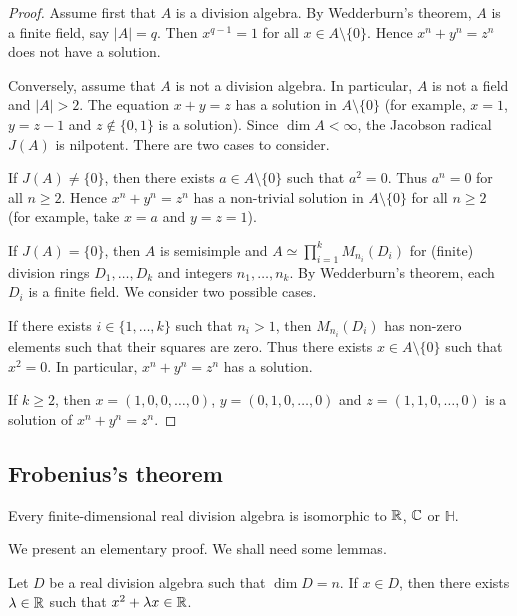 \begin{proof}
    Assume first that $A$ is a division algebra. By Wedderburn's theorem, 
    $A$ is a finite field, say $|A|=q$. Then $x^{q-1}=1$ for all $x\in A\setminus\{0\}$.
    Hence $x^n+y^n=z^n$ does not have a solution. 
    
    Conversely, assume that $A$ is not a division algebra. In particular, 
    $A$ is not a field and $|A|>2$. The equation $x+y=z$ has a solution in $A\setminus\{0\}$ (for example, $x=1$, $y=z-1$ and $z\not\in\{0,1\}$ is a solution). Since
    $\dim A<\infty$, the Jacobson radical $J(A)$ is nilpotent. There are two 
    cases to consider. 
    
    If $J(A)\ne\{0\}$, 
    then there exists $a\in A\setminus\{0\}$ such that $a^2=0$. Thus $a^n=0$ 
    for all $n\geq2$. Hence $x^n+y^n=z^n$ has a non-trivial
    solution in $A\setminus\{0\}$ for all $n\geq2$ (for example, take 
    $x=a$ and $y=z=1$).
    
    If $J(A)=\{0\}$, then $A$ is semisimple and 
    $A\simeq\prod_{i=1}^k M_{n_i}(D_i)$ for (finite) division rings $D_1,\dots,D_k$
    and integers $n_1,\dots,n_k$. By Wedderburn's theorem, each $D_i$ is a finite
    field. We consider two possible cases. 
    
    If there exists $i\in\{1,\dots,k\}$ such that $n_i>1$, then
    $M_{n_i}(D_i)$ has non-zero elements such that their squares are zero. Thus 
    there exists $x\in A\setminus\{0\}$ such that $x^2=0$. In particular, 
    $x^n+y^n=z^n$ has a solution. 
    
    If $k\geq 2$, then $x=(1,0,0,\dots,0)$, $y=(0,1,0,\dots,0)$ 
    and $z=(1,1,0,\dots,0)$ is a solution of $x^n+y^n=z^n$.
\end{proof}


\subsection{Frobenius's theorem}

\begin{theorem}[Frobenius]
	\label{thm:Frobenius}
	Every finite-dimensional real division algebra is isomorphic to $\mathbb{R}$, $\mathbb{C}$
	or $\mathbb{H}$.
\end{theorem}

We present an elementary proof. We shall need some lemmas. 

\begin{lemma}
	\label{lem:trick_frobenius1}
	Let $D$ be a real division algebra such that $\dim D=n$. If $x\in D$, then
	there exists $\lambda\in\mathbb{R}$ such that $x^2+\lambda x\in\mathbb{R}$.
\end{lemma}

